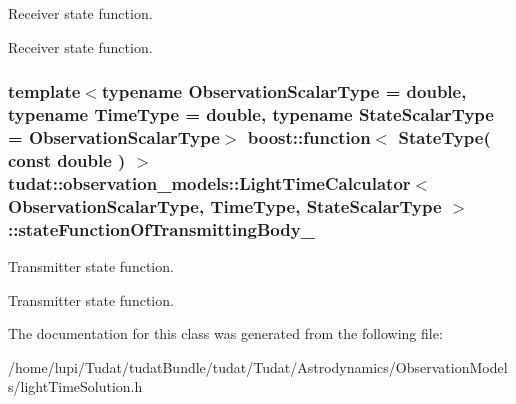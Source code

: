 Receiver state function. 

Receiver state function. 
\subsubsection[{\texorpdfstring{state\+Function\+Of\+Transmitting\+Body\+\_\+}{stateFunctionOfTransmittingBody_}}]{\setlength{\rightskip}{0pt plus 5cm}template$<$typename Observation\+Scalar\+Type  = double, typename Time\+Type  = double, typename State\+Scalar\+Type  = Observation\+Scalar\+Type$>$ boost\+::function$<$ State\+Type( const double ) $>$ {\bf tudat\+::observation\+\_\+models\+::\+Light\+Time\+Calculator}$<$ Observation\+Scalar\+Type, Time\+Type, State\+Scalar\+Type $>$\+::state\+Function\+Of\+Transmitting\+Body\+\_\+\hspace{0.3cm}{\ttfamily [protected]}}\hypertarget{classtudat_1_1observation__models_1_1LightTimeCalculator_af259e010986b119ed8792a70aea82553}{}\label{classtudat_1_1observation__models_1_1LightTimeCalculator_af259e010986b119ed8792a70aea82553}


Transmitter state function. 

Transmitter state function. 

The documentation for this class was generated from the following file\+:\begin{DoxyCompactItemize}
\item 
/home/lupi/\+Tudat/tudat\+Bundle/tudat/\+Tudat/\+Astrodynamics/\+Observation\+Models/light\+Time\+Solution.\+h\end{DoxyCompactItemize}
